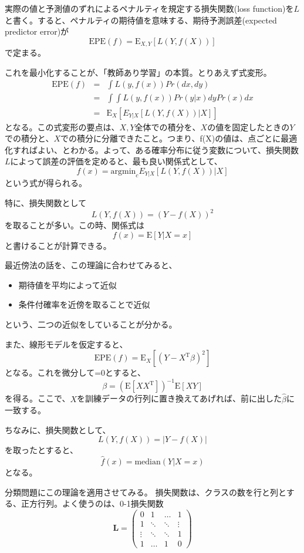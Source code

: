 \documentclass{jsarticle}
\begin{document}
実際の値と予測値のずれによるペナルティを規定する損失関数(loss function)を$L$と書く。すると、ペナルティの期待値を意味する、期待予測誤差(expected predictor error)が
\[
  \mathrm{EPE}(f)=\mathrm{E}_{X,Y}[L(Y,f(X))]
\]
で定まる。

これを最小化することが、「教師あり学習」の本質。とりあえず式変形。
\begin{eqnarray*}
  \mathrm{EPE}(f)&=&\int L(y, f(x)) Pr(dx, dy) \\
  &=&\int \int L(y,f(x)) Pr(y|x) dy Pr(x) dx \\
  &=& \mathrm{E} _X[E_{Y|X}[L(Y, f(X))|X]]
\end{eqnarray*}
となる。この式変形の要点は、$X,Y$全体での積分を、$X$の値を固定したときの$Y$での積分と、$X$での積分に分離できたこと。つまり、f(X)の値は、点ごとに最適化すればよい、とわかる。よって、ある確率分布に従う変数について、損失関数$L$によって誤差の評価を定めると、最も良い関係式として、
\[
  f(x)=\mathrm{argmin} _c E_{Y|X}[L(Y, f(X))|X]
\]
という式が得られる。

特に、損失関数として
\[
  L(Y, f(X)) = (Y-f(X))^2
\]
を取ることが多い。この時、関係式は
\[
  f(x) = \mathrm{E}[Y|X=x]
\]
と書けることが計算できる。

最近傍法の話を、この理論に合わせてみると、
\begin{itemize}
  \item 期待値を平均によって近似
  \item 条件付確率を近傍を取ることで近似
\end{itemize}
という、二つの近似をしていることが分かる。

また、線形モデルを仮定すると、
\[
  \mathrm{EPE}(f)=\mathrm{E}_X[(Y-X^\mathrm{T}\beta)^2]
\]
となる。これを微分して=0とすると、
\[
  \beta=(\mathrm{E}[XX^\mathrm{T}])^{-1}\mathrm{E}[XY]
\]
を得る。ここで、$X$を訓練データの行列に置き換えてあげれば、前に出した$\hat{\beta}$に一致する。

ちなみに、損失関数として、
\[
  L(Y, f(X)) = |Y-f(X)|
\]
を取ったとすると、
\[
  \hat{f}(x) = \mathrm{median}(Y|X=x)
\]
となる。

分類問題にこの理論を適用させてみる。
損失関数は、クラスの数を行と列とする、正方行列。よく使うのは、0-1損失関数
\[
\textbf{L} = \left(
    \begin{array}{cccc}
      0 & 1 & \dots & 1 \\
      1 & \ddots & \ddots & \vdots \\
      \vdots & \ddots & \ddots & 1 \\
      1 & \dots & 1 & 0
    \end{array}
  \right)
\]
\end{document}
